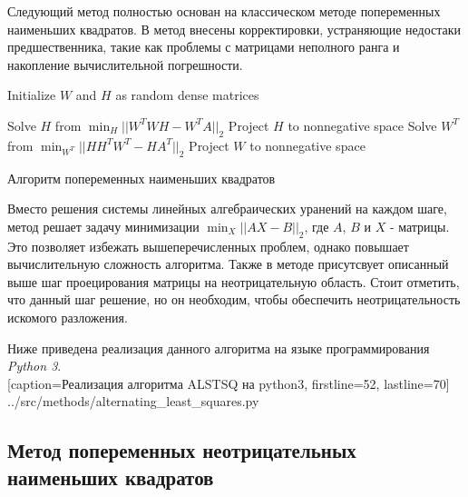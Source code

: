 Следующий метод полностью основан на классическом методе попеременных наименьших квадратов.
В метод внесены корректировки, устраняющие недостаки предшественника, такие как проблемы
с матрицами неполного ранга и накопление вычислительной погрешности.


\begin{algorithm} \label{alg:als_lstsq}

  \BlankLine
  \BlankLine


  \BlankLine

  Initialize $W$ and $H$ as random dense matrices\;

   {
    Solve $H$ from $\displaystyle\min_H||W^TWH - W^TA||_2$\;
    Project $H$ to nonnegative space\;
    Solve $W^T$ from $\displaystyle\min_{W^T}||HH^TW^T - HA^T||_2$\;
    Project $W$ to nonnegative space\;
  }

  \BlankLine

  \caption{Алгоритм попеременных наименьших квадратов}
\end{algorithm}

Вместо решения системы линейных алгебраических уранений на каждом шаге,
метод решает задачу минимизации $\displaystyle\min_X||AX - B||_2$, где $A$, $B$ и $X$ - матрицы.
Это позволяет избежать вышеперечисленных проблем,
однако повышает вычислительную сложность алгоритма.
Также в методе присутсвует описанный выше шаг проецирования матрицы
на неотрицательную область.
Стоит отметить, что данный шаг  решение, но он необходим,
чтобы обеспечить неотрицательность искомого разложения.

\newpage

Ниже приведена реализация данного алгоритма на языке программирования \textit{Python 3}.
\\


  [caption=Реализация алгоритма ALSTSQ на python3, firstline=52, lastline=70]
  {../src/methods/alternating_least_squares.py} \label{code:als_lstsq}



\newpage



\subsection{Метод попеременных неотрицательных наименьших квадратов}

